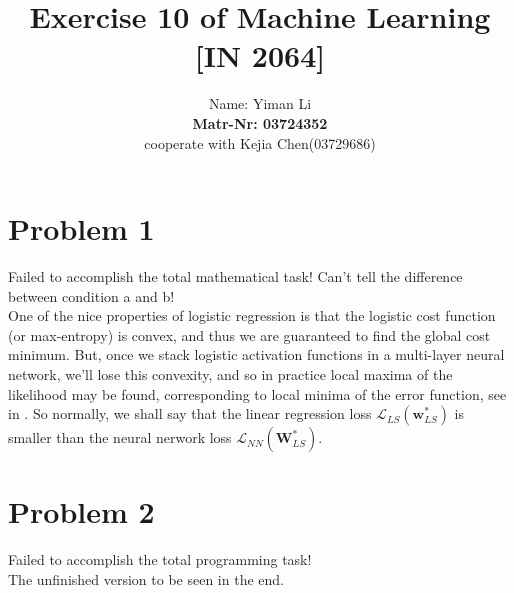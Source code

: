 \documentclass{article}
\title{Exercise 10 of Machine Learning [IN 2064]}
\author{
  Name: Yiman Li \\
  \textbf{Matr-Nr: 03724352} \\
  cooperate with Kejia Chen(03729686)\\
}
\begin{document}
\maketitle

\section*{Problem 1}
Failed to accomplish the total mathematical task! Can't tell the difference between condition a and b!\\

One of the nice properties of logistic regression is that the logistic cost function (or max-entropy) is convex, and thus we are guaranteed to find the global cost minimum. But, once we stack logistic activation functions in a multi-layer neural network, we’ll lose this convexity, and so in practice local maxima of the likelihood may be found, corresponding to local minima of the error function, see in \cite{bishop2007}. So normally, we shall say that the linear regression loss $\mathcal{L}_{LS}(\bm{w}_{LS}^*)$ is smaller than the neural nerwork loss $\mathcal{L}_{NN}(\bm{W}^*_{LS})$.
\section*{Problem 2}
Failed to accomplish the total programming task!\\

The unfinished version to be seen in the end.

\small


\end{document}
